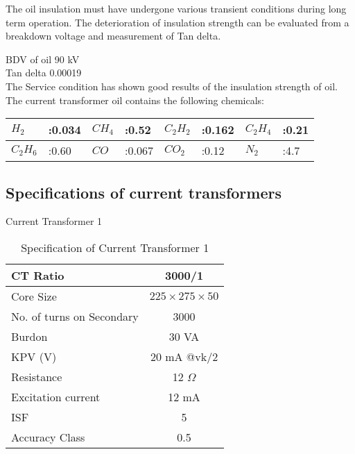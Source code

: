 The oil insulation must have undergone various transient conditions during long term operation. The deterioration of insulation strength can be evaluated from a breakdown voltage and measurement of Tan delta.

BDV of oil 90 kV\\
Tan delta 0.00019\\

The Service condition has shown good results of the insulation strength of oil.\\
The current transformer oil contains the following chemicals:\\

\begin{tabular}{| l l | l l | l l | l l | }
\hline
$H_2$ & :0.034 & $CH_4$ & :0.52 & $C_2H_2$ & :0.162 &  $C_2H_4$ & :0.21\\ \hline
$C_2H_6$ & :0.60 & $CO$ & :0.067 & $CO_2$& :0.12 & $N_2$ & :4.7 \\ \hline 
\end{tabular}

\subsection{Specifications of current transformers}
Current Transformer 1
\begin{table}[h!]
\caption{Specification of Current Transformer 1}
\label{table:Specification of Current Transformer 1}
\centering
\begin{tabular}{|l|c|}
\hline 
CT Ratio &  3000/1  \\ \hline 
Core Size & $225 \times 275 \times 50$ \\ \hline 
No. of turns on Secondary  & 3000 \\ \hline 
Burdon & 30 VA  \\ \hline 
KPV (V)  & 20 mA @vk/2 \\ \hline 
Resistance  & 12 $\Omega$\\ \hline 
Excitation current & 12 mA \\ \hline 
ISF  & 5 \\ \hline 
Accuracy Class  & 0.5 \\ \hline 
\end{tabular} 
\end{table}

